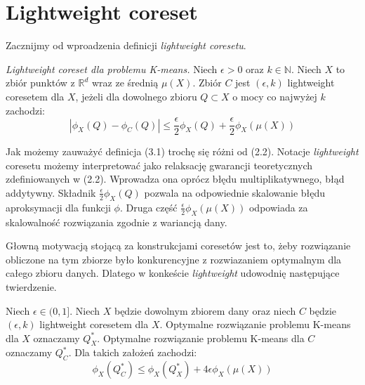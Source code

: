 \section{Lightweight coreset}

Zacznijmy od wproadzenia definicji \textit{lightweight coresetu}.
\begin{definition}
    \emph{Lightweight coreset dla problemu K-means.} Niech $\epsilon > 0$ oraz $k \in \mathbb{N}$.
    Niech $X$ to zbiór punktów z $\mathbb{R}^{d}$ wraz ze średnią $\mu(X)$.
    Zbiór $C$ jest $(\epsilon, k)$ lightweight coresetem dla $X$, jeżeli dla dowolnego zbioru $Q \subset X$ o mocy co najwyżej $k$ zachodzi:
    \begin{equation}
        |\phi_{X}(Q) - \phi_{C}(Q)| \leq \frac{\epsilon}{2}\phi_{X}(Q) + \frac{\epsilon}{2}\phi_{X}(\mu(X))
    \end{equation}
\end{definition}

\noindent
Jak możemy zauważyć definicja (3.1) trochę się różni od (2.2).
Notacje \textit{lightweight} coresetu możemy interpretować jako relaksację gwarancji teoretycznych zdefiniowanych w (2.2).
Wprowadza ona oprócz błędu multiplikatywnego, błąd addytywny.
Składnik $\frac{\epsilon}{2}\phi_{X}(Q)$ pozwala na odpowiednie skalowanie błędu aproksymacji dla funkcji $\phi$.
Druga część $\frac{\epsilon}{2}\phi_{X}(\mu(X))$ odpowiada za skalowalność rozwiązania zgodnie z wariancją dany.

Głowną motywacją stojącą za konstrukcjami coresetów jest to, żeby rozwiązanie obliczone na tym zbiorze było konkurencyjne z rozwiazaniem optymalnym dla całego zbioru danych.
Dlatego w konkeście \textit{lightweight} udowodnię następujące twierdzenie.

\begin{thm}
    Niech $\epsilon \in (0, 1]$. Niech $X$ będzie dowolnym zbiorem dany oraz niech $C$ będzie $(\epsilon, k)$ lightweight coresetem dla $X$.
    Optymalne rozwiązanie problemu K-means dla $X$ oznaczamy $Q_{X}^{*}$.
    Optymalne rozwiązanie problemu K-means dla $C$ oznaczamy $Q_{C}^{*}$.
    Dla takich założeń zachodzi:
    \begin{equation}
        \phi_{X}(Q_{C}^{*}) \leq \phi_{X}(Q_{X}^{*}) + 4\epsilon\phi_{X}(\mu(X))
    \end{equation}
\end{thm}

